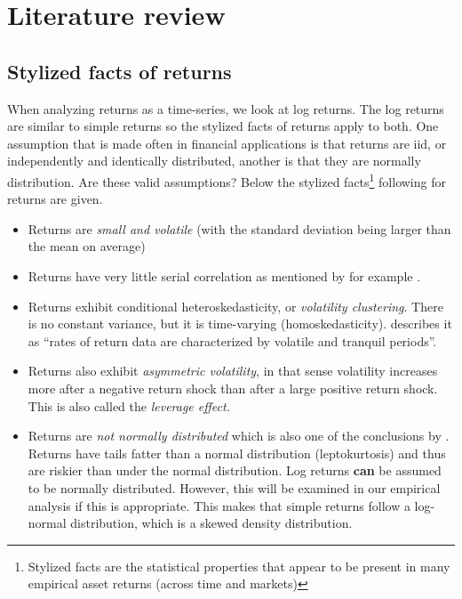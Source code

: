 \documentclass[a4paper, twoside]{templates/ociamthesis}
\begin{document}
\hypertarget{lit-rev}{%
\chapter{Literature review}\label{lit-rev}}

\minitoc 

\hypertarget{styl-facts}{%
\section{Stylized facts of returns}\label{styl-facts}}

\noindent When analyzing returns as a time-series, we look at log returns. The log returns are similar to simple returns so the stylized facts of returns apply to both. One assumption that is made often in financial applications is that returns are iid, or independently and identically distributed, another is that they are normally distribution. Are these valid assumptions? Below the stylized facts\footnote{Stylized facts are the statistical properties that appear to be present in many empirical asset returns (across time and markets)} following \textcite{annaert2021} for returns are given.

\begin{itemize}
\item
  Returns are \emph{small and volatile} (with the standard deviation being larger than the mean on average)
\item
  Returns have very little serial correlation as mentioned by for example \textcite{bollerslev1987}.
\item
  Returns exhibit conditional heteroskedasticity, or \emph{volatility clustering}. There is no constant variance, but it is time-varying (homoskedasticity). \textcite{bollerslev1987} describes it as ``rates of return data are characterized by volatile and tranquil periods''.
\item
  Returns also exhibit \emph{asymmetric volatility}, in that sense volatility increases more after a negative return shock than after a large positive return shock. This is also called the \emph{leverage effect.}
\item
  Returns are \emph{not normally distributed} which is also one of the conclusions by \textcite{fama1965}. Returns have tails fatter than a normal distribution (leptokurtosis) and thus are riskier than under the normal distribution. Log returns \textbf{can} be assumed to be normally distributed. However, this will be examined in our empirical analysis if this is appropriate. This makes that simple returns follow a log-normal distribution, which is a skewed density distribution.
\end{itemize}
\end{document}
